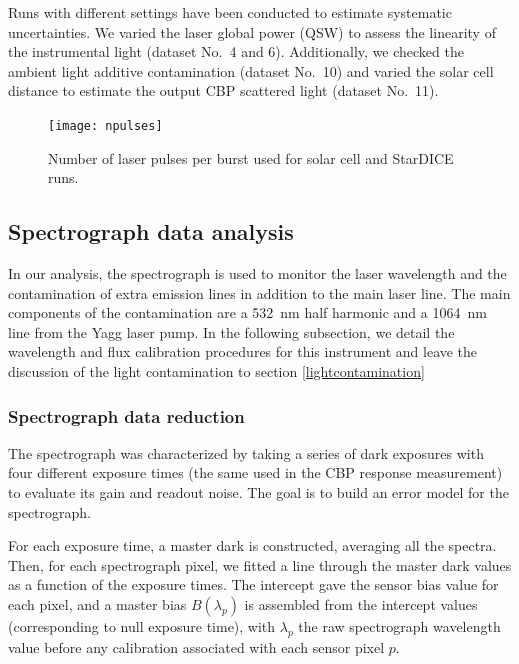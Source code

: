Runs with different settings have been conducted to estimate systematic uncertainties. We varied the laser global power (QSW) to assess the linearity of the instrumental light (dataset No.~4 and 6). Additionally, we checked the ambient light additive contamination (dataset No.~10) and varied the solar cell distance to estimate the output CBP scattered light (dataset No.~11).

\begin{figure}[!h]
\centering
\texttt{[image: npulses]}
\caption{Number of laser pulses per burst used for solar cell and StarDICE runs.}\label{fig:npulses}
\end{figure}

\subsection{Spectrograph data analysis}


In our analysis, the spectrograph is used to monitor the laser wavelength and the contamination of extra emission lines in addition to the main laser line. The main components of the contamination are a \SI{532}{\nm} half harmonic and a \SI{1064}{\nm} line from the Yagg laser pump. In the following subsection, we detail the wavelength and flux calibration procedures for this instrument and leave the discussion of the light contamination to section \ref{lightcontamination}



\subsubsection{Spectrograph data reduction}\label{sec:spectro_reduction}


The spectrograph was characterized by taking a series of dark exposures with four different exposure times (the same used in the CBP response measurement) to evaluate its gain and readout noise. The goal is to build an error model for the spectrograph.

For each exposure time, a master dark is constructed, averaging all the spectra. Then, for each spectrograph pixel, we fitted a line through the master dark values as a function of the exposure times. The intercept gave the sensor bias value for each pixel, and a master bias $B(\lambda_p)$ is assembled from the intercept values (corresponding to null exposure time), with $\lambda_p$ the raw spectrograph wavelength value before any calibration associated with each sensor pixel $p$. 



